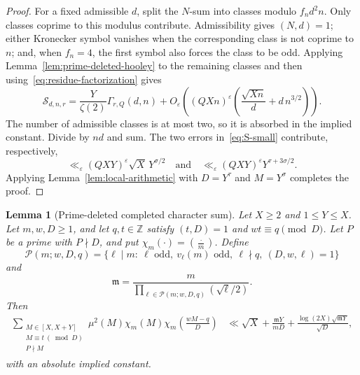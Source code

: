 \documentclass[12pt,reqno]{amsart}
\numberwithin{equation}{section}
\theoremstyle{plain}
\newtheorem{lemma}[theorem]{Lemma}
\theoremstyle{definition}
\theoremstyle{remark}
\begin{document}
\begin{proof}
For a fixed admissible $d$, split the $N$-sum into classes modulo $f_nd^2n$.
Only classes coprime to this modulus contribute.  Admissibility gives $(N,d)=1$; either Kronecker symbol vanishes when the corresponding class is not coprime to $n$; and, when $f_n=4$, the first symbol also forces the class to be odd.
Applying Lemma~\ref{lem:prime-deleted-hooley} to the remaining classes and then using~\eqref{eq:residue-factorization} gives
\begin{equation}\label{eq:S-small}
\mathcal S_{d,n,r}
=
\frac{Y}{\zeta(2)}
\Gamma_{r,Q}(d,n)
+
O_\varepsilon\left(
(QXn)^\varepsilon
\left(
\frac{\sqrt{Xn}}d+d\,n^{3/2}
\right)
\right).
\end{equation}
The number of admissible classes is at most two, so it is absorbed in the implied constant.  Divide by $nd$ and sum.
The two errors in~\eqref{eq:S-small} contribute, respectively,
\[
\ll_\varepsilon
(QXY)^\varepsilon\sqrt X\,Y^{\sigma/2}
\quad\text{and}\quad
\ll_\varepsilon
(QXY)^\varepsilon Y^{\tau+3\sigma/2}.
\]
Applying Lemma~\ref{lem:local-arithmetic} with $D=Y^\tau$ and $M=Y^\sigma$ completes the proof.
\end{proof}

\begin{lemma}[Prime-deleted completed character sum]
\label{lem:prime-deleted-character-sum}
Let $X\geq2$ and $1\leq Y\leq X$.  Let $m,w,D\geq1$, and let $q,t\in\mathbb Z$ satisfy $(t,D)=1$ and $wt\equiv q\pmod D$.
Let $P$ be a prime with $P\nmid D$, and put $\chi_m(\cdot)=(\frac{\cdot}{m})$.
Define
\[
\mathcal P(m;w,D,q)
=
\{\ell\mid m:\ \ell\text{ odd},\ v_\ell(m)\text{ odd},\
\ell\nmid q,\ (D,w,\ell)=1\}
\]
and
\[
\mathfrak m
=
\frac{m}{\displaystyle
\prod_{\ell\in\mathcal P(m;w,D,q)}(\sqrt\ell/2)}.
\]
Then
\begin{equation}
\begin{aligned}
\sum_{\substack{M\in[X,X+Y]\\M\equiv t\ (\bmod D)\\P\nmid M}}
\mu^2(M)\chi_m(M)
\chi_m\left(\frac{wM-q}{D}\right)
&\ll
\sqrt X+\frac{\mathfrak mY}{mD}
+\frac{\log(2X)\sqrt{\mathfrak mY}}{\sqrt D},
\end{aligned}
\label{eq:prime-deleted-character-sum}
\end{equation}
with an absolute implied constant.
\end{lemma}
\end{document}
